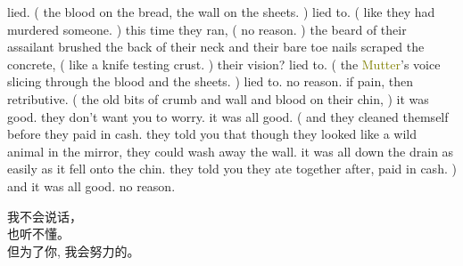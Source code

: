 \documentclass[11pt]{article}
\begin{document}
\begingroup
lied. ( the blood on the bread, the wall on the sheets. ) lied to. ( like they had murdered someone. ) this time they ran, ( no reason. ) the beard of their assailant brushed the back of their neck and their bare toe nails scraped the concrete, ( like a knife testing crust. ) their vision? lied to. ( the \textcolor{olive}{Mutter}'s voice slicing through the blood and the sheets. ) lied to. no reason. if pain, then retributive. ( the old bits of crumb and wall and blood on their chin, ) it was good. they don't want you to worry. it was all good. ( and they cleaned themself before they paid in cash. they told you that though they looked like a wild animal in the mirror, they could wash away the wall. it was all down the drain as easily as it fell onto the chin. they told you they ate together after, paid in cash. ) and it was all good. no reason. 
\endgroup

\vspace*{2\baselineskip}

\begingroup
\begin{center}
{\setmainfont{Source Han Serif SC}\selectfont
\textcolor{OliveGreen}{我不会说话，\\ \vspace*{2\baselineskip} 也听不懂。\\ \vspace*{2\baselineskip} 但为了你, 我会努力的。}
}
\end{center}
\endgroup
\end{document}
